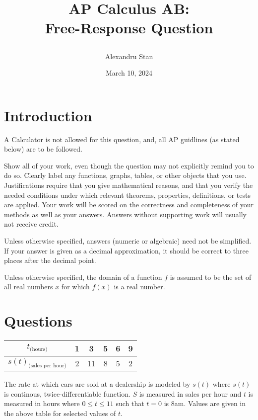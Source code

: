 \documentclass{article}
\title{
    \textbf{AP Calculus AB: \\Free-Response Question}
    \author{Alexandru Stan}
    \date{March 10, 2024}
}
\begin{document}
    \maketitle
    \vfill
    \newpage

    \section*{Introduction}

    A Calculator is not allowed for this question, and, all AP guidlines (as stated below) 
    are to be followed. 

    Show all of your work, even though the question may not explicitly remind you to do so. Clearly label any
    functions, graphs, tables, or other objects that you use. Justifications require that you give mathematical reasons,
    and that you verify the needed conditions under which relevant theorems, properties, definitions, or tests are
    applied. Your work will be scored on the correctness and completeness of your methods as well as your answers.
    Answers without supporting work will usually not receive credit.

    Unless otherwise specified, answers (numeric or algebraic) need not be simplified. If your answer is given as a
    decimal approximation, it should be correct to three places after the decimal point.

    Unless otherwise specified, the domain of a function $f$ is assumed to be the set of all real numbers $x$ for which
    $f(x)$ is a real number.

    \section*{Questions}

    \begin{table}[h]
        \def\arraystretch{2}
        \begin{tabular}{|c|c|c|c|c|c|}
            \hline
            $t_{\text{(hours)}}$ & 1 & 3 & 5 & 6 & 9 \\
            \hline
            $s(t)_{\text{(sales per hour)}}$ & 2 & 11 & 8 & 5 & 2 \\
            \hline 
        \end{tabular}
    \end{table} 

    The rate at which cars are sold at a dealership is modeled by $s(t)$ where $s(t)$ is continous, twice-differentiable function.
    $S$ is measured in sales per hour and $t$ is measured in hours where $0 \le t \le 11$ such that
    $t = 0$ is 8am. Values are given in the above table for selected values of $t$.
\end{document}
